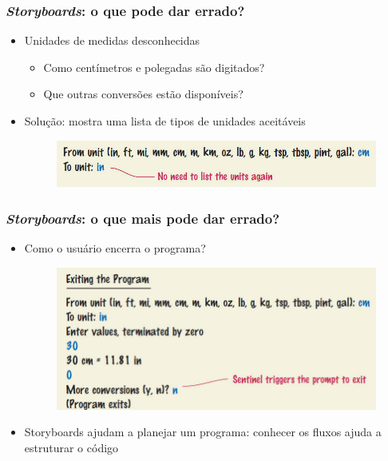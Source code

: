 \documentclass[xcolor={dvipsnames,table},aspectratio=169]{beamer}
\begin{document}
\begin{frame}\frametitle{\emph{Storyboards}: o que pode dar errado?}
\begin{itemize}
	\item Unidades de medidas desconhecidas
	\begin{itemize}
		\item Como centímetros e polegadas são digitados?
		\item Que outras conversões estão disponíveis?
	\end{itemize}
	\item Solução: mostra uma lista de tipos de unidades aceitáveis
\begin{figure}[h]
	\includegraphics[height=0.15\paperheight,center]{pucrs-ep-fprog-unidade_04-lacos-laminas-storyboards2.jpg}
\end{figure}
\end{itemize}
\end{frame}

\begin{frame}\frametitle{\emph{Storyboards}: o que mais pode dar errado?}
\begin{itemize}
	\item Como o usuário encerra o programa?
\begin{figure}[h]
	\includegraphics[height=0.5\paperheight,center]{pucrs-ep-fprog-unidade_04-lacos-laminas-storyboards3.jpg}
\end{figure}
	\item Storyboards ajudam a planejar um programa: conhecer os fluxos ajuda a estruturar o código
\end{itemize}
\end{frame}
\end{document}
